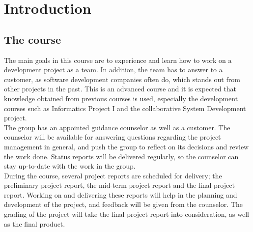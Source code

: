 \chapter{Introduction}
\section{The course}
										
The main goals in this course are to experience and learn how to work on a 
development project as a team. In addition, the team has to answer to a 
customer, as software development companies often do, which stands out from 
other projects in the past. This is an advanced course and it is expected that 
knowledge obtained from previous courses is used, especially the development 
courses such as Informatics Project I and the collaborative System Development 
project. \\

The group has an appointed guidance counselor as well as a customer. The 
counselor will be available for answering questions regarding the project 
management in general, and push the group to reflect on its decisions and 
review the work done. Status reports will be delivered regularly, so the 
counselor can stay up-to-date with the work in the group. \\

During the course, several project reports are scheduled for delivery; the 
preliminary project report, the mid-term project report and the final project 
report. Working on and delivering these reports will help in the planning and 
development of the project, and feedback will be given from the counselor. The 
grading of the project will take the final project report into consideration, 
as well as the final product.\\

